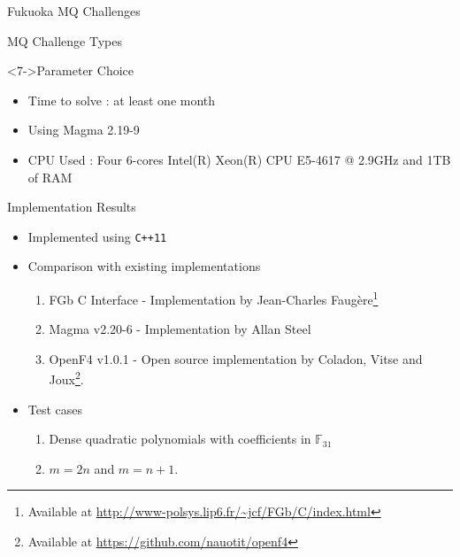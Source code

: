 \documentclass{beamer}
\newcommand{\Field}{\mathbb{F}}
\newcommand{\FField}[1]{\Field_{#1}}
\begin{document}
\begin{section}{Fukuoka MQ Challenges}
\begin{frame}{MQ Challenge Types}
    \begin{block}<7->{Parameter Choice}
      \begin{itemize}
      \item<8-> Time to solve : at least one month
      \item<9-> Using Magma 2.19-9
      \item<10-> CPU Used : \alert{Four 6-cores Intel(R) Xeon(R) CPU
          E5-4617 @ 2.9GHz} and \alert{1TB of RAM}
      \end{itemize}
    \end{block}
  \end{frame}
\end{section}


\begin{section}{Implementation Results}
  \begin{frame}
    \begin{itemize}
    \item<1-> Implemented using \texttt{C++11}
    \item<2-> Comparison with existing implementations
      \begin{enumerate}
      \item FGb C Interface - Implementation by Jean-Charles
        Faug\`{e}re\footnote<2->{Available at
          \url{http://www-polsys.lip6.fr/~jcf/FGb/C/index.html}}
      \item Magma v2.20-6 - Implementation by Allan Steel
      \item OpenF4 v1.0.1 - Open source implementation by Coladon,
        Vitse and Joux\footnote<2->{Available at
          \url{https://github.com/nauotit/openf4}}.
      \end{enumerate}

    \item<3-> Test cases
      \begin{enumerate}
      \item Dense quadratic polynomials with coefficients in $\FField{31}$
      \item $m = 2n$ and $m = n + 1$.
      \end{enumerate}
      
     
    \end{itemize}
    
  \end{frame}


\end{section}
\end{document}
